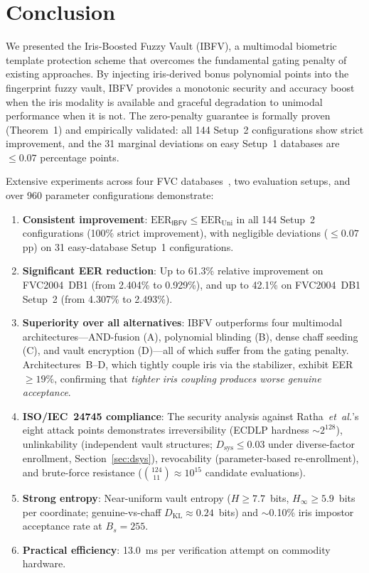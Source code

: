 \documentclass[conference]{IEEEtran}
\newcommand{\IBFV}{\textsf{IBFV}}
\newcommand{\EER}{\mathrm{EER}}
\begin{document}
\section{Conclusion}
\label{sec:conclusion}

We presented the Iris-Boosted Fuzzy Vault (\IBFV{}), a multimodal biometric template protection scheme that overcomes the fundamental gating penalty of existing approaches. By injecting iris-derived bonus polynomial points into the fingerprint fuzzy vault, \IBFV{} provides a monotonic security and accuracy boost when the iris modality is available and graceful degradation to unimodal performance when it is not. The zero-penalty guarantee is formally proven (Theorem~1) and empirically validated: all 144 Setup~2 configurations show strict improvement, and the 31 marginal deviations on easy Setup~1 databases are $\leq 0.07$ percentage points.

Extensive experiments across four FVC databases~\cite{maio2002fvc2002,maio2004fvc2004}, two evaluation setups, and over 960 parameter configurations demonstrate:
\begin{enumerate}
    \item \textbf{Consistent improvement}: $\EER_{\IBFV} \leq \EER_{\text{Uni}}$ in all 144 Setup~2 configurations (100\% strict improvement), with negligible deviations ($\leq 0.07$ pp) on 31 easy-database Setup~1 configurations.
    \item \textbf{Significant EER reduction}: Up to 61.3\% relative improvement on FVC2004~DB1 (from 2.404\% to 0.929\%), and up to 42.1\% on FVC2004~DB1 Setup~2 (from 4.307\% to 2.493\%).
    \item \textbf{Superiority over all alternatives}: \IBFV{} outperforms four multimodal architectures---AND-fusion (A), polynomial blinding (B), dense chaff seeding (C), and vault encryption (D)---all of which suffer from the gating penalty. Architectures~B--D, which tightly couple iris via the stabilizer, exhibit EER $\geq 19\%$, confirming that \emph{tighter iris coupling produces worse genuine acceptance}.
    \item \textbf{ISO/IEC~24745 compliance}: The security analysis against Ratha~\textit{et~al.}'s~\cite{ratha2001enhancing} eight attack points demonstrates irreversibility (ECDLP hardness $\sim\!2^{128}$), unlinkability (independent vault structures; $D_{\text{sys}} \leq 0.03$ under diverse-factor enrollment, Section~\ref{sec:dsys}), revocability (parameter-based re-enrollment), and brute-force resistance ($\binom{124}{11} \approx 10^{15}$ candidate evaluations).
    \item \textbf{Strong entropy}: Near-uniform vault entropy ($H \geq 7.7$~bits, $H_\infty \geq 5.9$~bits per coordinate; genuine-vs-chaff $D_{\mathrm{KL}} \approx 0.24$~bits) and $\sim$0.10\% iris impostor acceptance rate at $B_s = 255$.
    \item \textbf{Practical efficiency}: 13.0~ms per verification attempt on commodity hardware.
\end{enumerate}
\end{document}
